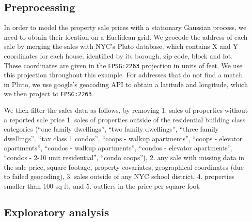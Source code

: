 \documentclass[letter]{article}
\begin{document}
    	\subsection{Preprocessing}\label{preprocessing}

In order to model the property sale prices with a stationary Gaussian process, we need to obtain their location on a Euclidean grid. We geocode the address of each sale by merging the sales with NYC's Pluto database, which contains X and Y coordinates for each house, identified by its borough, zip code, block and lot. These coordinates are given in the \texttt{EPSG:2263} projection in units of feet. We use this projection throughout this example. For addresses that do not find a match in Pluto, we use google's geocoding API to obtain a latitude and longitude, which we then project to \texttt{EPSG:2263}.

We then filter the sales data as follows, by removing
1. sales of properties without a reported sale price
1. sales of properties outside of the residential building class categories (``one family dwellings'', ``two family dwellings'', ``three family dwellings'', ``tax class 1 condos'', ``coops - walkup apartments'', ``coops - elevator apartments'', ``condos - walkup apartments'', ``condos - elevator apartments'', ``condos - 2-10 unit residential'', ``condo coops''),
2. any sale with missing data in the sale price, square footage, property covariates, geographical coordinates (due to failed geocoding),
3. sales outside of any NYC school district,
4. properties smaller than 100 sq ft, and
5. outliers in the price per square foot.
    


    	\subsection{Exploratory analysis}\label{exploratory-analysis}
\end{document}
